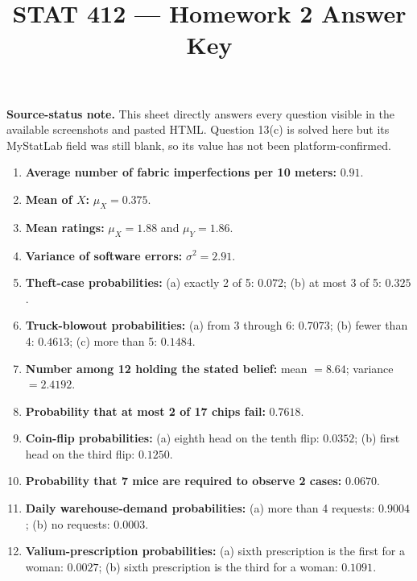 \documentclass[11pt]{article}
\title{STAT 412 --- Homework 2 Answer Key}
\author{}
\date{}
\begin{document}
\maketitle

\noindent\textbf{Source-status note.} This sheet directly answers every
question visible in the available screenshots and pasted HTML. Question 13(c)
is solved here but its MyStatLab field was still blank, so its value has not
been platform-confirmed.

\begin{enumerate}[leftmargin=*,label=\textbf{\arabic*.}]
\item \textbf{Average number of fabric imperfections per 10 meters:} $0.91$.

\item \textbf{Mean of $X$:} $\mu_X=0.375$.

\item \textbf{Mean ratings:} $\mu_X=1.88$ and $\mu_Y=1.86$.

\item \textbf{Variance of software errors:} $\sigma^2=2.91$.

\item \textbf{Theft-case probabilities:}
(a) exactly 2 of 5: $0.072$;
(b) at most 3 of 5: $0.325$.

\item \textbf{Truck-blowout probabilities:}
(a) from 3 through 6: $0.7073$;
(b) fewer than 4: $0.4613$;
(c) more than 5: $0.1484$.

\item \textbf{Number among 12 holding the stated belief:}
mean $=8.64$; variance $=2.4192$.

\item \textbf{Probability that at most 2 of 17 chips fail:} $0.7618$.

\item \textbf{Coin-flip probabilities:}
(a) eighth head on the tenth flip: $0.0352$;
(b) first head on the third flip: $0.1250$.

\item \textbf{Probability that 7 mice are required to observe 2 cases:}
$0.0670$.

\item \textbf{Daily warehouse-demand probabilities:}
(a) more than 4 requests: $0.9004$;
(b) no requests: $0.0003$.

\item \textbf{Valium-prescription probabilities:}
(a) sixth prescription is the first for a woman: $0.0027$;
(b) sixth prescription is the third for a woman: $0.1091$.


\end{enumerate}
\end{document}
